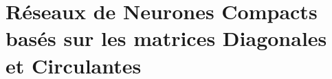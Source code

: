 \section{Réseaux de Neurones Compacts basés sur les matrices Diagonales et Circulantes}
\label{section:ap7-diagonal_circulant_neural_network}


%
%
